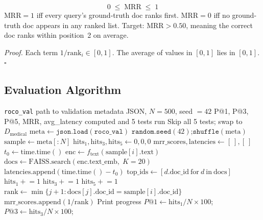 \documentclass[12pt,a4paper]{article}
\newcounter{mthm}[section]
\newenvironment{mtheorem}[1][]{%
  \refstepcounter{mthm}%
  \begin{tcolorbox}[mythm, title={Theorem~\thesection.\themthm%
    \ifx\relax#1\relax\else\ (#1)\fi}]%
}{\end{tcolorbox}}
\begin{document}
\begin{mtheorem}[MRR Bounds]
\[
  0 \;\leq\; \text{MRR} \;\leq\; 1
\]
$\text{MRR} = 1$ iff every query's ground-truth doc ranks first.
$\text{MRR} = 0$ iff no ground-truth doc appears in any ranked list.
Target: $\text{MRR} > 0.50$, meaning the correct doc ranks within position~2 on average.

\textit{Proof.} Each term $1/\text{rank}_i \in [0, 1]$. The average of values in $[0,1]$
lies in $[0,1]$. \hfill$\square$
\end{mtheorem}

\subsection{Evaluation Algorithm}

\begin{algorithm}[H]
\caption{\texttt{run\_retrieval()} --- Quantitative evaluation loop on ROCO val set}
\label{alg:retrieval}
\begin{algorithmic}[1]
\Require \texttt{roco\_val} path to validation metadata JSON, $N = 500$, seed $= 42$
\Ensure P@1, P@3, P@5, MRR, avg\_latency computed and 5 tests run
  \State Skip all 5 tests; \Return
\EndIf
\State swap to $D_{\text{medical}}$
\State $\text{meta} \gets \texttt{json.load}(\texttt{roco\_val})$
\State $\texttt{random.seed}(42)$;\quad $\texttt{shuffle}(\text{meta})$
\State $\text{sample} \gets \text{meta}[:N]$
\State $\text{hits}_1, \text{hits}_3, \text{hits}_5 \gets 0, 0, 0$
\State $\text{mrr\_scores}, \text{latencies} \gets [\ ], [\ ]$
  \State $t_0 \gets \text{time.time}()$
  \State $\text{enc} \gets f_{\text{text}}(\text{sample}[i].\text{text})$
  \State $\text{docs} \gets \text{FAISS.search}(\text{enc.text\_emb},\; K=20)$
  \State $\text{latencies.append}(\text{time.time}() - t_0)$
  \State $\text{top\_ids} \gets [d.\text{doc\_id}\ \text{for}\ d\ \text{in}\ \text{docs}]$
   $\text{hits}_1 \mathrel{+}= 1$ \EndIf
   $\text{hits}_3 \mathrel{+}= 1$ \EndIf
   $\text{hits}_5 \mathrel{+}= 1$ \EndIf
  \State $\text{rank} \gets \min\!\{j+1 : \text{docs}[j].\text{doc\_id} = \text{sample}[i].\text{doc\_id}\}$
   $\text{mrr\_scores.append}(1/\text{rank})$ \EndIf
   Print progress \EndIf
\EndFor
\State $P@1 \gets \text{hits}_1/N \times 100$;\quad $P@3 \gets \text{hits}_3/N \times 100$;\quad

\end{algorithmic}
\end{algorithm}
\end{document}
